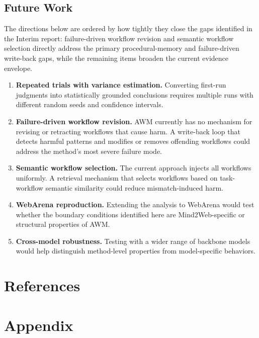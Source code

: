 \documentclass{article}
\begin{document}
\subsection{Future Work}\label{future-work}

The directions below are ordered by how tightly they close the gaps
identified in the Interim report: failure-driven workflow revision and
semantic workflow selection directly address the primary
procedural-memory and failure-driven write-back gaps, while the
remaining items broaden the current evidence envelope.

\begin{enumerate}
\def\labelenumi{\arabic{enumi}.}
\item
  \textbf{Repeated trials with variance estimation.} Converting
  first-run judgments into statistically grounded conclusions requires
  multiple runs with different random seeds and confidence intervals.
\item
  \textbf{Failure-driven workflow revision.} AWM currently has no
  mechanism for revising or retracting workflows that cause harm. A
  write-back loop that detects harmful patterns and modifies or removes
  offending workflows could address the method's most severe failure
  mode.
\item
  \textbf{Semantic workflow selection.} The current approach injects all
  workflows uniformly. A retrieval mechanism that selects workflows
  based on task-workflow semantic similarity could reduce
  mismatch-induced harm.
\item
  \textbf{WebArena reproduction.} Extending the analysis to WebArena
  would test whether the boundary conditions identified here are
  Mind2Web-specific or structural properties of AWM.
\item
  \textbf{Cross-model robustness.} Testing with a wider range of
  backbone models would help distinguish method-level properties from
  model-specific behaviors.
\end{enumerate}

\section{References}\label{references}

\printbibliography[heading=none]

\clearpage
\appendix
\section{Appendix}\label{appendix}

\setcounter{table}{0}
\renewcommand{\thetable}{A\arabic{table}}

{\small
\setlength{\tabcolsep}{5pt}
\renewcommand{\arraystretch}{1.15}
\setlength{\LTleft}{0pt}
\setlength{\LTright}{0pt}

}


\end{document}
